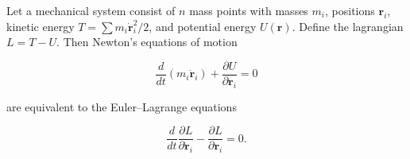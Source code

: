 Let a mechanical system consist of $n$ mass points with masses $m_i$, positions $\mathbf{r}_i$, kinetic energy $T = \sum m_i \dot{\mathbf{r}}_i^2/2$, and potential energy $U(\mathbf{r})$. Define the lagrangian $L = T - U$. Then Newton's equations of motion

$$\frac{d}{dt} (m_i \dot{\mathbf{r}}_i) + \frac{\partial U}{\partial \mathbf{r}_i} = 0$$

are equivalent to the Euler–Lagrange equations

$$\frac{d}{dt} \frac{\partial L}{\partial \dot{\mathbf{r}}_i} - \frac{\partial L}{\partial \mathbf{r}_i} = 0.$$

